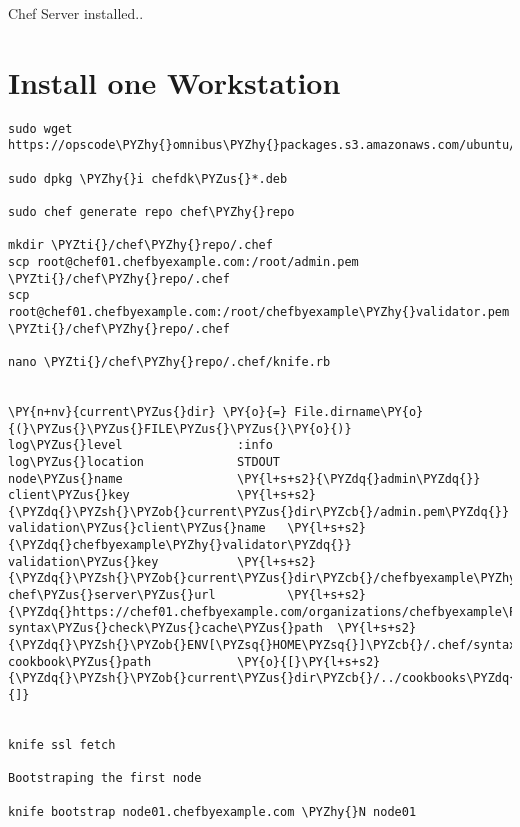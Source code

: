 
Chef Server installed..

\section{Install one Workstation}

\begin{codelisting}
\label{code:}
\codecaption{}
\begin{Verbatim}[fontsize=\relsize{-2.5},fontseries=b,commandchars=\\\{\}]
sudo wget https://opscode\PYZhy{}omnibus\PYZhy{}packages.s3.amazonaws.com/ubuntu/12.04/x86\PYZus{}64/chefdk\PYZus{}0.7.0\PYZhy{}1\PYZus{}amd64.deb

sudo dpkg \PYZhy{}i chefdk\PYZus{}*.deb

sudo chef generate repo chef\PYZhy{}repo

mkdir \PYZti{}/chef\PYZhy{}repo/.chef
scp root@chef01.chefbyexample.com:/root/admin.pem \PYZti{}/chef\PYZhy{}repo/.chef
scp root@chef01.chefbyexample.com:/root/chefbyexample\PYZhy{}validator.pem \PYZti{}/chef\PYZhy{}repo/.chef

nano \PYZti{}/chef\PYZhy{}repo/.chef/knife.rb


\PY{n+nv}{current\PYZus{}dir} \PY{o}{=} File.dirname\PY{o}{(}\PYZus{}\PYZus{}FILE\PYZus{}\PYZus{}\PY{o}{)}
log\PYZus{}level                :info
log\PYZus{}location             STDOUT
node\PYZus{}name                \PY{l+s+s2}{\PYZdq{}admin\PYZdq{}}
client\PYZus{}key               \PY{l+s+s2}{\PYZdq{}\PYZsh{}\PYZob{}current\PYZus{}dir\PYZcb{}/admin.pem\PYZdq{}}
validation\PYZus{}client\PYZus{}name   \PY{l+s+s2}{\PYZdq{}chefbyexample\PYZhy{}validator\PYZdq{}}
validation\PYZus{}key           \PY{l+s+s2}{\PYZdq{}\PYZsh{}\PYZob{}current\PYZus{}dir\PYZcb{}/chefbyexample\PYZhy{}validator.pem\PYZdq{}}
chef\PYZus{}server\PYZus{}url          \PY{l+s+s2}{\PYZdq{}https://chef01.chefbyexample.com/organizations/chefbyexample\PYZdq{}}
syntax\PYZus{}check\PYZus{}cache\PYZus{}path  \PY{l+s+s2}{\PYZdq{}\PYZsh{}\PYZob{}ENV[\PYZsq{}HOME\PYZsq{}]\PYZcb{}/.chef/syntaxcache\PYZdq{}}
cookbook\PYZus{}path            \PY{o}{[}\PY{l+s+s2}{\PYZdq{}\PYZsh{}\PYZob{}current\PYZus{}dir\PYZcb{}/../cookbooks\PYZdq{}}\PY{o}{]}


knife ssl fetch

Bootstraping the first node

knife bootstrap node01.chefbyexample.com \PYZhy{}N node01
\end{Verbatim}
\end{codelisting}

